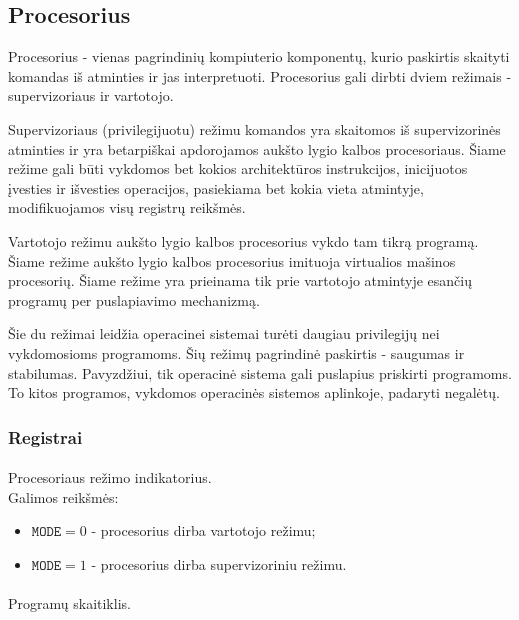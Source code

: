 \documentclass{scrartcl}
\begin{document}
        \subsection{Procesorius}
            Procesorius - vienas pagrindinių kompiuterio komponentų, kurio paskirtis skaityti komandas iš atminties ir jas interpretuoti. Procesorius gali dirbti dviem režimais - supervizoriaus ir vartotojo.
            \par
            Supervizoriaus (privilegijuotu) režimu komandos yra skaitomos iš supervizorinės atminties ir yra betarpiškai apdorojamos aukšto lygio kalbos procesoriaus. Šiame režime gali būti vykdomos bet kokios architektūros instrukcijos, inicijuotos įvesties ir išvesties operacijos, pasiekiama bet kokia vieta atmintyje, modifikuojamos visų registrų reikšmės.
            \par
            Vartotojo režimu aukšto lygio kalbos procesorius vykdo tam tikrą programą. Šiame režime aukšto lygio kalbos procesorius imituoja virtualios mašinos procesorių. Šiame režime yra prieinama tik prie vartotojo atmintyje esančių programų per puslapiavimo mechanizmą.
            \par
            Šie du režimai leidžia operacinei sistemai turėti daugiau privilegijų nei vykdomosioms programoms. Šių režimų pagrindinė paskirtis - saugumas ir stabilumas. Pavyzdžiui, tik operacinė sistema gali puslapius priskirti programoms. To kitos programos, vykdomos operacinės sistemos aplinkoje, padaryti negalėtų.
            \subsubsection{Registrai}
                \paragraph{} Procesoriaus režimo indikatorius. \mbox{} \\
                    Galimos reikšmės:
                    \begin{itemize}
                        \item $\texttt{MODE} = 0$ - procesorius dirba vartotojo režimu;
                        \item $\texttt{MODE} = 1$ - procesorius dirba supervizoriniu režimu.
                    \end{itemize}
                \paragraph{} Programų skaitiklis.
\end{document}
